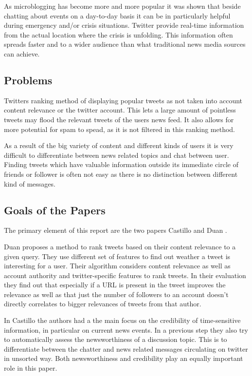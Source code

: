 \documentclass{proseminar}
\let\i\undefined
\newcommand{\i}[1]{\emph{#1}}
\begin{document}
As microblogging has become more and more popular it was shown that beside chatting about events on a day-to-day basis it can be in particularly helpful during emergency and/or crisis situations.
Twitter provide real-time information from the actual location where the crisis is unfolding. This information often spreads faster and to a wider audience than what traditional news media sources can achieve.



\subsection*{Problems}
Twitters ranking method of displaying popular tweets as not taken into account content relevance or the twitter account.
This lets a large amount of pointless tweets may flood the relevant tweets of the users news feed. It also allows for more potential for spam to spead, as it is not filtered in this ranking method.

As a result of the big variety of content and different kinds of users it is very difficult to differentiate between news related topics and chat between user. Finding tweets which have valuable information outside its immediate circle of friends or follower is often not easy as there is no distinction between different kind of messages. 



\subsection*{Goals of the Papers}
The primary element of this report are the two papers Castillo \i{et al.} and Duan \i{et al.}.

Duan \i{et al.}\cite{P2} proposes a method to rank tweets based on their content relevance to a given query. They use different set of features to find out weather a tweet is interesting for a user. Their \i{learning to rank} algorithm considers content relevance as well as account authority and twitter-specific features to rank tweets. In their evaluation they find out that especially if a URL is present in the tweet improves the relevance as well as that just the number of followers to an account doesn't directly correlates to bigger relevances of tweets from that author.

In Castillo \i{et al.}\cite{P1} the authors had a the main focus on the credibility of time-sensitive information, in particular on current news events. In a previous step they also try to automatically assess the newsworthiness of a discussion topic. This is to differentiate between the chatter and news related messages circulating on twitter in unsorted way. Both newsworthiness and credibility play an equally important role in this paper.
\end{document}
